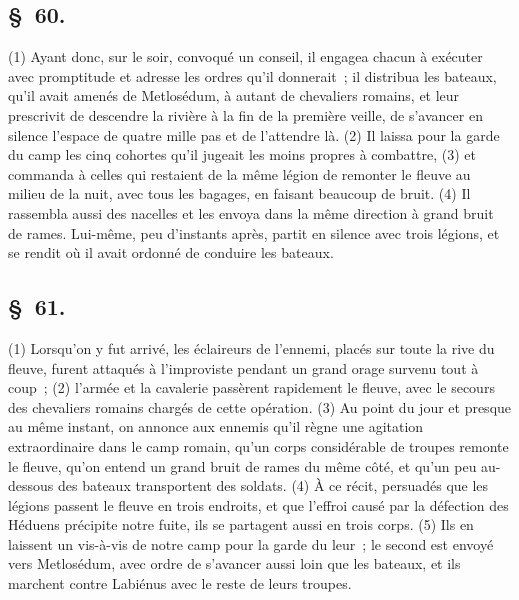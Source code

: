 \documentclass[french,twoside]{book} %
\begin{document}
\subsection[{§ 60.}]{ \textsc{§ 60.} }
\noindent (1) Ayant donc, sur le soir, convoqué un conseil, il engagea chacun à exécuter avec promptitude et adresse les ordres qu’il donnerait ; il distribua les bateaux, qu’il avait amenés de Metlosédum, à autant de chevaliers romains, et leur prescrivit de descendre la rivière à la fin de la première veille, de s’avancer en silence l’espace de quatre mille pas et de l’attendre là. (2) Il laissa pour la garde du camp les cinq cohortes qu’il jugeait les moins propres à combattre, (3) et commanda à celles qui restaient de la même légion de remonter le fleuve au milieu de la nuit, avec tous les bagages, en faisant beaucoup de bruit. (4) Il rassembla aussi des nacelles et les envoya dans la même direction à grand bruit de rames. Lui-même, peu d’instants après, partit en silence avec trois légions, et se rendit où il avait ordonné de conduire les bateaux.
\subsection[{§ 61.}]{ \textsc{§ 61.} }
\noindent (1) Lorsqu’on y fut arrivé, les éclaireurs de l’ennemi, placés sur toute la rive du fleuve, furent attaqués à l’improviste pendant un grand orage survenu tout à coup ; (2) l’armée et la cavalerie passèrent rapidement le fleuve, avec le secours des chevaliers romains chargés de cette opération. (3) Au point du jour et presque au même instant, on annonce aux ennemis qu’il règne une agitation extraordinaire dans le camp romain, qu’un corps considérable de troupes remonte le fleuve, qu’on entend un grand bruit de rames du même côté, et qu’un peu au-dessous des bateaux transportent des soldats. (4) À ce récit, persuadés que les légions passent le fleuve en trois endroits, et que l’effroi causé par la défection des Héduens précipite notre fuite, ils se partagent aussi en trois corps. (5) Ils en laissent un vis-à-vis de notre camp pour la garde du leur ; le second est envoyé vers Metlosédum, avec ordre de s’avancer aussi loin que les bateaux, et ils marchent contre Labiénus avec le reste de leurs troupes.
\end{document}
